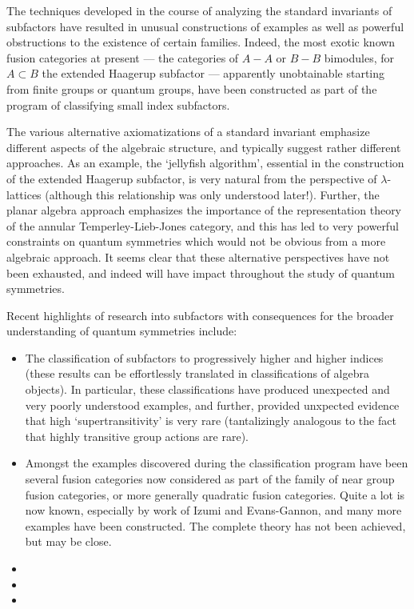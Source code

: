\documentclass[11pt]{article}
\begin{document}
The techniques developed in the course of analyzing the standard invariants of
subfactors have resulted in unusual constructions of examples as well as
powerful obstructions to the existence of certain families. Indeed, the most
exotic known fusion categories at present --- the categories of $A-A$ or $B-B$
bimodules, for $A \subset B$ the extended Haagerup subfactor --- apparently
unobtainable starting from finite groups or quantum groups, have been
constructed as part of the program of classifying small index subfactors.

The various alternative axiomatizations of a standard invariant emphasize
different aspects of the algebraic structure, and typically suggest rather
different approaches. As an example, the `jellyfish algorithm', essential in
the construction of the extended Haagerup subfactor, is very natural from the
perspective of $\lambda$-lattices (although this relationship was only
understood later!). Further, the planar algebra approach emphasizes the
importance of the representation theory of the annular Temperley-Lieb-Jones
category, and this has led to very powerful constraints on quantum symmetries
which would not be obvious from a more algebraic approach. It seems clear that
these alternative perspectives have not been exhausted, and indeed will have
impact throughout the study of quantum symmetries.

Recent highlights of research into subfactors with consequences for the broader understanding of quantum symmetries include:
\begin{itemize}
\item The classification of subfactors to progressively higher and higher indices (these results can be effortlessly translated in classifications of algebra objects). In particular, these classifications have produced unexpected and very poorly understood examples, and further, provided unxpected evidence that high `supertransitivity' is very rare (tantalizingly analogous to the fact that highly transitive group actions are rare).
\item Amongst the examples discovered during the classification program have been several fusion categories now considered as part of the family of near group fusion categories, or more generally quadratic fusion categories. Quite a lot is now known, especially by work of Izumi and Evans-Gannon, and many more examples have been constructed. The complete theory has not been achieved, but may be close.
\item {}
\item {}
\item {}
\end{itemize}
\end{document}
